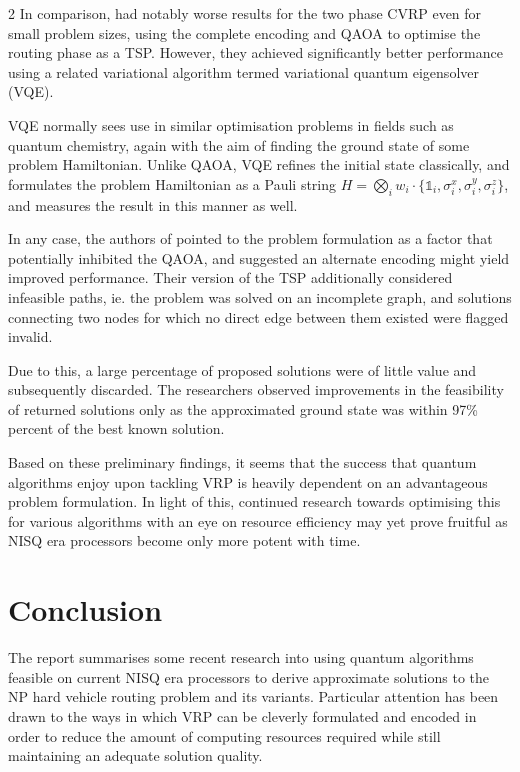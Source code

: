 \documentclass [10pt]{article}
\begin{document}
\begin {multicols}{2}
In comparison, \cite{cvrpqaoa} had notably worse results for the two phase
CVRP even for small problem sizes, using the complete encoding and QAOA to
optimise the routing phase as a TSP. However, they achieved significantly
better performance using a related variational algorithm termed variational
quantum eigensolver (VQE).

VQE normally sees use in similar optimisation problems in fields such as
quantum chemistry, again with the aim of finding the ground state of some
problem Hamiltonian. Unlike QAOA, VQE refines the initial state classically,
and formulates the problem Hamiltonian as a Pauli string $H = \bigotimes_i w_i
\cdot \{\mathbb{1}_i, \sigma^x_i, \sigma^y_i, \sigma^z_i\}$, and measures the
result in this manner as well.

In any case, the authors of \cite{cvrpqaoa} pointed to the problem formulation
as a factor that potentially inhibited the QAOA, and suggested an alternate
encoding might yield improved performance. Their version of the TSP
additionally considered infeasible paths, ie. the problem was solved on an
incomplete graph, and solutions connecting two nodes for which no direct edge
between them existed were flagged invalid.

Due to this, a large percentage of proposed solutions were of little value
and subsequently discarded. The researchers observed improvements in the
feasibility of returned solutions only as the approximated ground state was
within 97\% percent of the best known solution.

Based on these preliminary findings, it seems that the success that quantum
algorithms enjoy upon tackling VRP is heavily dependent on an advantageous
problem formulation. In light of this, continued research towards optimising
this for various algorithms with an eye on resource efficiency may yet prove
fruitful as NISQ era processors become only more potent with time.

\section {Conclusion}
The report summarises some recent research into using quantum algorithms 
feasible on current NISQ era processors to derive approximate solutions to the
NP hard vehicle routing problem and its variants. Particular attention has been
drawn to the ways in which VRP can be cleverly formulated and encoded in order
to reduce the amount of computing resources required while still maintaining
an adequate solution quality.


\end{multicols}
\end{document}
